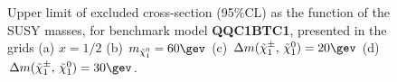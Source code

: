 
\begin{figure}[h]
  \centering
    \caption{
    Upper limit of excluded cross-section (95$\%$CL) as the function of the SUSY masses, for benchmark model \textbf{QQC1BTC1}, presented in the grids (a) $x=1/2$ (b) $\mLSP=60\gev$ (c) $\dmc=20\gev$ (d) $\dmc=30\gev$.
    \label{fig::Result::xsecUL::QQC1BTC1} }
\end{figure}

